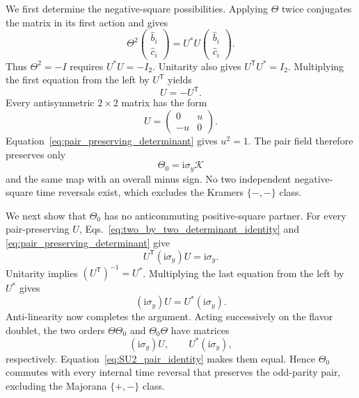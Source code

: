\documentclass[onecolumn,aps,prb,amsmath,amssymb,superscriptaddress,longbibliography]{revtex4-2}
\newcommand{\ii}{\mathrm{i}}
\newcommand{\trans}{\mathsf{T}}
\newcommand{\mc}[1]{\mathcal{#1}}
\begin{document}
We first determine the negative-square possibilities.  Applying \(\Theta\) twice conjugates the matrix in its first action and gives
\begin{equation}
    \Theta^2
    \begin{pmatrix}\hat b_i\\ \hat c_i\end{pmatrix}
    =U^*U\begin{pmatrix}\hat b_i\\ \hat c_i\end{pmatrix}.
    \label{eq:two_flavor_TR_square}
\end{equation}
Thus \(\Theta^2=-I\) requires \(U^*U=-I_2\).  Unitarity also gives \(U^\trans U^*=I_2\).  Multiplying the first equation from the left by \(U^\trans\) yields
\begin{equation}
    U=-U^\trans.
    \label{eq:negative_TR_antisymmetric}
\end{equation}
Every antisymmetric \(2\times2\) matrix has the form
\begin{equation}
    U=\begin{pmatrix}0&u\\-u&0\end{pmatrix}.
\end{equation}
Equation~\eqref{eq:pair_preserving_determinant} gives \(u^2=1\).  The pair field therefore preserves only
\begin{equation}
    \Theta_0=\ii\sigma_y\mc K
    \label{eq:unique_negative_pair_TR}
\end{equation}
and the same map with an overall minus sign.  No two independent negative-square time reversals exist, which excludes the Kramers \(\{-,-\}\) class.

We next show that \(\Theta_0\) has no anticommuting positive-square partner.  For every pair-preserving \(U\), Eqs.~\eqref{eq:two_by_two_determinant_identity} and \eqref{eq:pair_preserving_determinant} give
\begin{equation}
    U^\trans(\ii\sigma_y)U=\ii\sigma_y.
\end{equation}
Unitarity implies \((U^\trans)^{-1}=U^*\).  Multiplying the last equation from the left by \(U^*\) gives
\begin{equation}
    (\ii\sigma_y)U=U^*(\ii\sigma_y).
    \label{eq:SU2_pair_identity}
\end{equation}
Anti-linearity now completes the argument.  Acting successively on the flavor doublet, the two orders \(\Theta\Theta_0\) and \(\Theta_0\Theta\) have matrices
\begin{equation}
    (\ii\sigma_y)U,
    \qquad
    U^*(\ii\sigma_y),
    \label{eq:pair_TR_composition}
\end{equation}
respectively.  Equation~\eqref{eq:SU2_pair_identity} makes them equal.  Hence \(\Theta_0\) commutes with every internal time reversal that preserves the odd-parity pair, excluding the Majorana \(\{+,-\}\) class.
\end{document}
